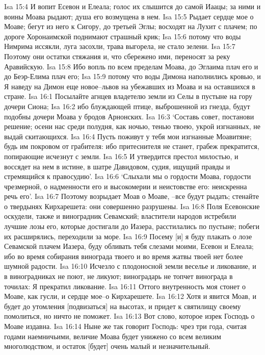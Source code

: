 Isa 15:4  И вопит Есевон и Елеала; голос их слышится до самой Иаацы; за ними и воины Моава рыдают; душа его возмущена в нем.
Isa 15:5  Рыдает сердце мое о Моаве; бегут из него к Сигору, до третьей Эглы; восходят на Лухит с плачем; по дороге Хоронаимской поднимают страшный крик;
Isa 15:6  потому что воды Нимрима иссякли, луга засохли, трава выгорела, не стало зелени.
Isa 15:7  Поэтому они остатки стяжания и, что сбережено ими, переносят за реку Аравийскую.
Isa 15:8  Ибо вопль по всем пределам Моава, до Эглаима плач его и до Беэр-Елима плач его;
Isa 15:9  потому что воды Димона наполнились кровью, и Я наведу на Димон еще новое--львов на убежавших из Моава и на оставшихся в стране.
Isa 16:1  Посылайте агнцев владетелю земли из Селы в пустыне на гору дочери Сиона;
Isa 16:2  ибо блуждающей птице, выброшенной из гнезда, будут подобны дочери Моава у бродов Арнонских.
Isa 16:3  `Составь совет, постанови решение; осени нас среди полудня, как ночью, тенью твоею, укрой изгнанных, не выдай скитающихся.
Isa 16:4  Пусть поживут у тебя мои изгнанные Моавитяне; будь им покровом от грабителя: ибо притеснителя не станет, грабеж прекратится, попирающие исчезнут с земли.
Isa 16:5  И утвердится престол милостью, и воссядет на нем в истине, в шатре Давидовом, судия, ищущий правды и стремящийся к правосудию'.
Isa 16:6  `Слыхали мы о гордости Моава, гордости чрезмерной, о надменности его и высокомерии и неистовстве его: неискренна речь его'.
Isa 16:7  Поэтому возрыдает Моав о Моаве, --все будут рыдать; стенайте о твердынях Кирхарешета: они совершенно разрушены.
Isa 16:8  Поля Есевонские оскудели, также и виноградник Севамский; властители народов истребили лучшие лозы его, которые достигали до Иазера, расстилались по пустыне; побеги их расширялись, переходили за море.
Isa 16:9  Посему [и] я буду плакать о лозе Севамской плачем Иазера, буду обливать тебя слезами моими, Есевон и Елеала; ибо во время собирания винограда твоего и во время жатвы твоей нет более шумной радости.
Isa 16:10  Исчезло с плодоносной земли веселье и ликование, и в виноградниках не поют, не ликуют; виноградарь не топчет винограда в точилах: Я прекратил ликование.
Isa 16:11  Оттого внутренность моя стонет о Моаве, как гусли, и сердце мое--о Кирхарешете.
Isa 16:12  Хотя и явится Моав, и будет до утомления [подвизаться] на высотах, и придет к святилищу своему помолиться, но ничто не поможет.
Isa 16:13  Вот слово, которое изрек Господь о Моаве издавна.
Isa 16:14  Ныне же так говорит Господь: чрез три года, считая годами наемничьими, величие Моава будет унижено со всем великим многолюдством, и остаток [будет] очень малый и незначительный.

